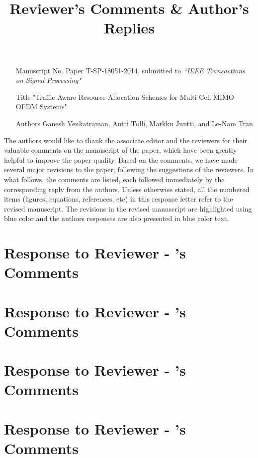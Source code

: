 \documentclass[11pt,letterpaper,onecolumn]{article}
\begin{document}
\title{Reviewer's Comments \& Author's Replies}

\maketitle

\begin{enumerate}
\item[Manuscript No.] Paper T-SP-18051-2014, submitted to \emph{``IEEE Transactions on Signal Processing"} \\
\item[Title] "Traffic Aware Resource Allocation Schemes for Multi-Cell MIMO-OFDM Systems" \\
\item[Authors] Ganesh Venkatraman, Antti T\"{o}lli, Markku Juntti, and Le-Nam Tran
\end{enumerate}

\vspace{2in}
The authors would like to thank the associate editor and the reviewers for their valuable comments on the manuscript of the paper, which have been greatly helpful to improve the paper quality. Based on the comments, we have made several major revisions to the paper, following the suggestions of the reviewers. In what follows, the comments are listed, each followed immediately by the corresponding reply from the authors. Unless otherwise stated, all the numbered items (figures, equations, references, etc) in this response letter refer to the revised manuscript. The revisions in the revised manuscript are highlighted using blue color and the authors responses are also presented in blue color text.

\newpage
\section*{Response to Reviewer - 's Comments}


\newpage
\section*{Response to Reviewer - 's Comments}


\newpage
\section*{Response to Reviewer - 's Comments}


\newpage
\section*{Response to Reviewer - 's Comments}

\end{document}
